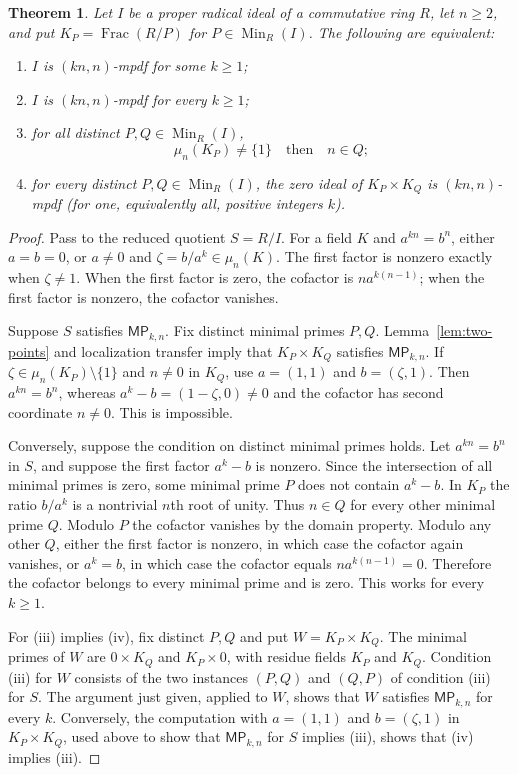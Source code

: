\documentclass[11pt,a4paper]{amsart}
\newtheorem{theorem}{Theorem}[section]
\theoremstyle{definition}
\theoremstyle{remark}
\newcommand{\MP}[2]{\mathsf{MP}_{#1,#2}}
\numberwithin{equation}{section}
\begin{document}
\begin{theorem}\label{thm:spectral}
Let $I$ be a proper radical ideal of a commutative ring $R$, let
$n\ge2$, and put $K_P=\operatorname{Frac}(R/P)$ for
$P\in\operatorname{Min}_R(I)$.  The following are equivalent:
\begin{enumerate}
\item $I$ is $(kn,n)$-mpdf for some $k\ge1$;
\item $I$ is $(kn,n)$-mpdf for every $k\ge1$;
\item for all distinct $P,Q\in\operatorname{Min}_R(I)$,
\[
 \mu_n(K_P)\ne\{1\}\quad\text{then}\quad n\in Q;
\]
\item for every distinct $P,Q\in\operatorname{Min}_R(I)$, the zero
ideal of $K_P\times K_Q$ is $(kn,n)$-mpdf (for one, equivalently all,
positive integers $k$).
\end{enumerate}
\end{theorem}
\begin{proof}
Pass to the reduced quotient $S=R/I$.  For a field $K$ and
$a^{kn}=b^n$, either $a=b=0$, or $a\ne0$ and
$\zeta=b/a^k\in\mu_n(K)$.  The first factor is nonzero exactly when
$\zeta\ne1$.  When the first factor is zero, the cofactor is
$na^{k(n-1)}$; when the first factor is nonzero, the cofactor vanishes.

Suppose $S$ satisfies $\MP{k}{n}$.  Fix distinct minimal primes
$P,Q$.  Lemma~\ref{lem:two-points} and localization transfer imply
that $K_P\times K_Q$ satisfies $\MP{k}{n}$.  If
$\zeta\in\mu_n(K_P)\setminus\{1\}$ and $n\ne0$ in $K_Q$, use
$a=(1,1)$ and $b=(\zeta,1)$.  Then $a^{kn}=b^n$, whereas
$a^k-b=(1-\zeta,0)\ne0$ and the cofactor has second coordinate
$n\ne0$.  This is impossible.

Conversely, suppose the condition on distinct minimal primes holds.
Let $a^{kn}=b^n$ in $S$, and suppose the first factor $a^k-b$ is
nonzero.  Since the intersection of all minimal primes is zero, some
minimal prime $P$ does not contain $a^k-b$.  In $K_P$ the ratio
$b/a^k$ is a nontrivial $n$th root of unity.  Thus $n\in Q$ for every
other minimal prime $Q$.  Modulo $P$ the cofactor vanishes by the
domain property.  Modulo any other $Q$, either the first factor is
nonzero, in which case the cofactor again vanishes, or $a^k=b$, in
which case the cofactor equals $na^{k(n-1)}=0$.  Therefore the cofactor
belongs to every minimal prime and is zero.  This works for every
$k\ge1$.

For (iii) implies (iv), fix distinct $P,Q$ and put $W=K_P\times K_Q$.
The minimal primes of $W$ are $0\times K_Q$ and $K_P\times0$, with residue fields
$K_P$ and $K_Q$. Condition (iii) for $W$ consists of the two instances $(P,Q)$ and
$(Q,P)$ of condition (iii) for $S$. The argument just given, applied to $W$,
shows that $W$ satisfies $\MP{k}{n}$ for every $k$.
Conversely, the computation with $a=(1,1)$ and $b=(\zeta,1)$ in $K_P\times K_Q$,
used above to show that $\MP{k}{n}$ for $S$ implies (iii), shows that (iv) implies (iii).
\end{proof}
\end{document}
